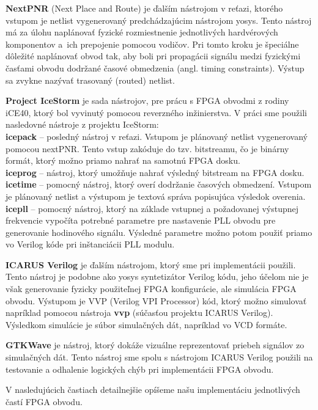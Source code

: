 \textbf{NextPNR} (Next Place and Route) \cite{nextpnr} je ďalším nástrojom v reťazi, ktorého vstupom je netlist vygenerovaný predchádzajúcim nástrojom yosys. Tento nástroj má za úlohu naplánovať fyzické rozmiestnenie jednotlivých hardvérových komponentov a~ich prepojenie pomocou vodičov. Pri tomto kroku je špeciálne dôležité naplánovať obvod tak, aby boli pri propagácii signálu medzi fyzickými časťami obvodu dodržané časové obmedzenia (angl. timing constraints). Výstup sa zvykne nazývať trasovaný (routed) netlist.

\textbf{Project IceStorm} \cite{icestorm} je sada nástrojov, pre prácu s FPGA obvodmi z rodiny iCE40, ktorý bol vyvinutý pomocou reverzného inžinierstva. V práci sme použili nasledovné nástroje z projektu IceStorm:\\
\textbf{icepack} -- posledný nástroj v  reťazi. Vstupom je plánovaný netlist vygenerovaný pomocou nextPNR. Tento vstup zakóduje do tzv. bitstreamu, čo je binárny formát, ktorý možno priamo nahrať na samotnú FPGA dosku.\\
\textbf{iceprog} -- nástroj, ktorý umožňuje nahrať výsledný bitstream na FPGA dosku.\\
\textbf{icetime} -- pomocný nástroj, ktorý overí dodržanie časových obmedzení. Vstupom je plánovaný netlist a výstupom je textová správa popisujúca výsledok overenia.\\
\textbf{icepll} -- pomocný nástroj, ktorý na základe vstupnej a požadovanej výstupnej frekvencie vypočíta potrebné parametre pre nastavenie PLL obvodu pre generovanie hodinového signálu. Výsledné parametre možno potom použiť priamo vo Verilog kóde pri inštanciácii PLL modulu.

\textbf{ICARUS Verilog} \cite{iverilog} je ďalším nástrojom, ktorý sme pri implementácii použili. Tento nástroj je podobne ako yosys syntetizátor Verilog kódu, jeho účelom nie je však generovanie fyzicky použiteľnej FPGA konfigurácie, ale simulácia FPGA obvodu. Výstupom je VVP (Verilog VPI Processor) kód, ktorý možno simulovať napríklad pomocou nástroja \textbf{vvp} (súčasťou projektu ICARUS Verilog). Výsledkom simulácie je súbor simulačných dát, napríklad vo VCD formáte.

\textbf{GTKWave} \cite{gtkwave} je nástroj, ktorý dokáže vizuálne reprezentovať priebeh signálov zo simulačných dát. Tento nástroj sme spolu s nástrojom ICARUS Verilog použili na testovanie a odhalenie logických chýb pri implementácii FPGA obvodu.

V nasledujúcich častiach detailnejšie opíšeme našu implementáciu jednotlivých častí FPGA obvodu.

